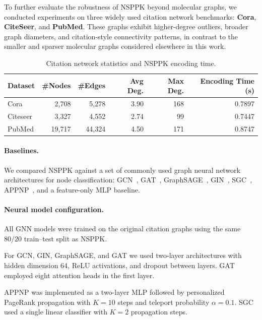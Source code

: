 To further evaluate the robustness of NSPPK beyond molecular graphs,
we conducted experiments on three widely used citation network
benchmarks: \textbf{Cora}, \textbf{CiteSeer}, and \textbf{PubMed}.
These graphs exhibit higher-degree outliers, broader graph diameters,
and citation-style connectivity patterns, in contrast to the smaller
and sparser molecular graphs considered elsewhere in this work.

\begin{table}[h]
\centering
\caption{Citation network statistics and NSPPK encoding time.}
\scriptsize
\setlength{\tabcolsep}{4pt}
\begin{tabular}{lrrrrr}
\toprule
Dataset & \#Nodes & \#Edges & Avg Deg. & Max Deg. & Encoding Time (s) \\
\midrule
Cora     & 2{,}708  & 5{,}278  & 3.90 & 168 & 0.7897 \\
Citeseer & 3{,}327  & 4{,}552  & 2.74 & 99  & 0.7447 \\
PubMed   & 19{,}717 & 44{,}324 & 4.50 & 171 & 0.8747 \\
\bottomrule
\end{tabular}
\end{table}

\paragraph{Baselines.}
We compared NSPPK against a set of commonly used graph neural
network architectures for node classification:
GCN~\citep{kipf2017semi},
GAT~\citep{velivckovic2018gat},
GraphSAGE~\citep{hamilton2017graphsage},
GIN~\citep{xu2019powerful},
SGC~\citep{wu2019simplifying},
APPNP~\citep{klicpera2019predict},
and a feature-only MLP baseline.

\paragraph{Neural model configuration.}
All GNN models were trained on the original citation graphs using
the same 80/20 train--test split as NSPPK.

For GCN, GIN, GraphSAGE, and GAT we used two-layer architectures
with hidden dimension 64, ReLU activations, and dropout between
layers. GAT employed eight attention heads in the first layer.

APPNP was implemented as a two-layer MLP followed by personalized
PageRank propagation with $K=10$ steps and teleport probability
$\alpha=0.1$. SGC used a single linear classifier with $K=2$
propagation steps.

